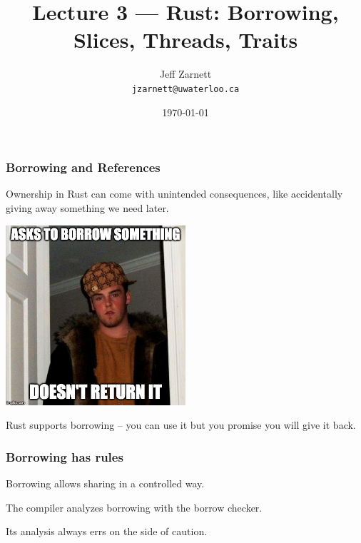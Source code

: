 


\title{Lecture 3 --- Rust: Borrowing, Slices, Threads, Traits  }

\author{Jeff Zarnett \\ \small \texttt{jzarnett@uwaterloo.ca}}
\date{\today}




\begin{frame}
  \titlepage

 \end{frame}
 
 
\begin{frame}
\frametitle{Borrowing and References}

Ownership in Rust can come with unintended consequences, like accidentally giving away something we need later.

\begin{center}
	\includegraphics[width=0.5\textwidth]{images/steve.jpeg}
\end{center}

Rust supports \alert{borrowing} -- you can use it but you promise you will give it back.

\end{frame}


\begin{frame}
\frametitle{Borrowing has rules}

Borrowing allows sharing in a controlled way.

The compiler analyzes borrowing with the \alert{borrow checker}. 

Its analysis always errs on the side of caution.


\end{frame}


